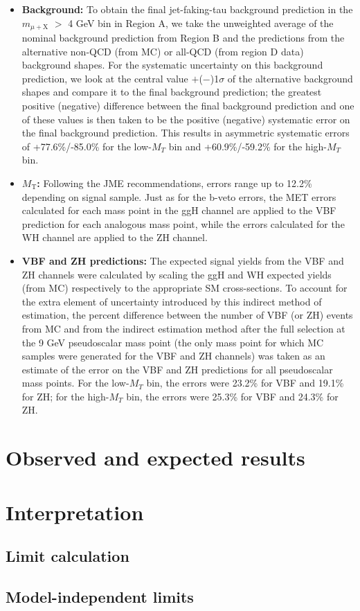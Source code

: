 \begin{itemize}
\item \textbf{Background: } To obtain the final jet-faking-tau background prediction in the $m_{\mu+\text{X}}$ $>$ 4 GeV bin in Region A, we take the unweighted average of the nominal background prediction from Region B and the predictions from the alternative non-QCD (from MC) or all-QCD (from region D data) background shapes. For the systematic uncertainty on this background prediction, we look at the central value $+$($-$)1$\sigma$ of the alternative background shapes and compare it to the final background prediction; the greatest positive (negative) difference between the final background prediction and one of these values is then taken to be the positive (negative) systematic error on the final background prediction. This results in asymmetric systematic errors of +77.6\%/-85.0\% for the low-$M_{T}$ bin and +60.9\%/-59.2\% for the high-$M_{T}$ bin.
\item \textbf{$M_{\text{T}}$: } Following the JME recommendations, errors range up to 12.2\% depending on signal sample. Just as for the b-veto errors, the MET errors calculated for each mass point in the ggH channel are applied to the VBF prediction for each analogous mass point, while the errors calculated for the WH channel are applied to the ZH channel.
\item \textbf{VBF and ZH predictions: } The expected signal yields from the VBF and ZH channels were calculated by scaling the ggH and WH expected yields (from MC) respectively to the appropriate SM cross-sections. To account for the extra element of uncertainty introduced by this indirect method of estimation, the percent difference between the number of VBF (or ZH) events from MC and from the indirect estimation method after the full selection at the 9 GeV pseudoscalar mass point (the only mass point for which MC samples were generated for the VBF and ZH channels) was taken as an estimate of the error on the VBF and ZH predictions for all pseudoscalar mass points. For the low-$M_{T}$ bin, the errors were 23.2\% for VBF and 19.1\% for ZH; for the high-$M_{T}$ bin, the errors were 25.3\% for VBF and 24.3\% for ZH.
\end{itemize}

\section{Observed and expected results\label{sec:results-obsexp}}

\section{Interpretation\label{sec:results-interpretation}}

\subsection{Limit calculation\label{sec:results-limitcalc}}

\subsection{Model-independent limits\label{sec:results-limits}}